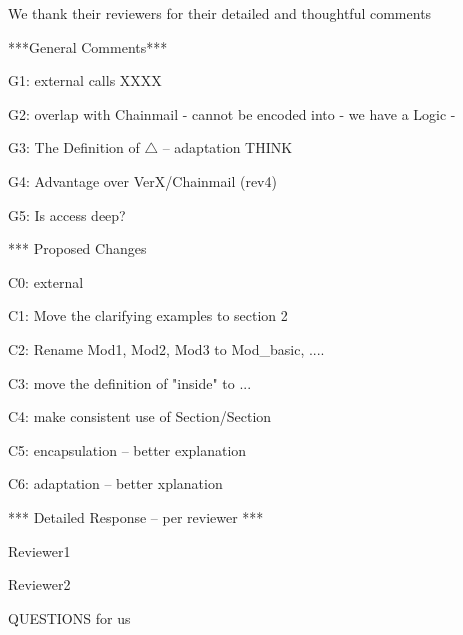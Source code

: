 We thank their reviewers for their detailed and thoughtful comments 


***General Comments***

G1: external calls
XXXX

G2:  overlap with Chainmail
- cannot be encoded into
- we have a Logic
- %

G3: The Definition of $\triangle$ -- adaptation
THINK

G4: Advantage over VerX/Chainmail (rev4)

G5: Is access deep?


*** Proposed Changes

C0: external

C1: Move the clarifying examples to section 2

C2: Rename Mod1, Mod2, Mod3 to Mod_{basic}, ....

C3: move the definition of "inside" to ...

C4: make consistent use of Section/Section

C5: encapsulation -- better explanation

C6: adaptation -- better xplanation

 


*** Detailed Response -- per reviewer ***

Reviewer1

Reviewer2


QUESTIONS for us